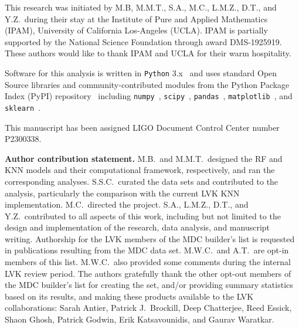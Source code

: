 This research was initiated by M.B, M.M.T., S.A., M.C., L.M.Z., D.T., and Y.Z.\ during their stay at the Institute of Pure and Applied Mathematics (IPAM),  University of California
Los-Angeles (UCLA). IPAM is partially supported by the National Science Foundation through award DMS-1925919. These authors would like to thank IPAM and UCLA for their warm hospitality.

Software for this analysis is written in \texttt{Python} 3.x~\cite{python3} and uses standard Open Source libraries and community-contributed modules from the Python Package Index (PyPI)
repository~\cite{pypi} including \texttt{numpy}~\cite{harris2020array}, \texttt{scipy}~\cite{2020SciPy-NMeth}, \texttt{pandas}~\cite{reback2020pandas,mckinney-proc-scipy-2010},
\texttt{matplotlib}~\cite{Hunter:2007ouj}, and \texttt{sklearn}~\cite{scikit-learn}.

This manuscript has been assigned LIGO Document Control Center number P2300338.

\textbf{Author contribution statement.} M.B.\ and M.M.T.\ designed the \ac{RF} and \ac{KNN} models and their computational framework, respectively, and ran the corresponding analyses.
S.S.C.\ curated the data sets and contributed to the analysis, particularly the comparison with the current \ac{LVK} \ac{KNN} implementation. M.C.\ directed the project. S.A., L.M.Z.,
D.T., and Y.Z.\ contributed to all aspects of this work, including but not limited to the design and implementation of the research, data analysis, and manuscript writing.  Authorship for
the \ac{LVK} members of the \ac{MDC} builder's list is requested in publications resulting from the \ac{MDC} data set.  M.W.C.\ and A.T.\ are opt-in members of this list. M.W.C.\ also
provided some comments during the internal \ac{LVK} review period. The authors gratefully thank the other opt-out members of the \ac{MDC} builder's list for creating the set, and/or
providing summary statistics based on its results, and making these products available to the \ac{LVK} collaborations: Sarah Antier, Patrick J.~Brockill, Deep Chatterjee, Reed Essick,
Shaon Ghosh, Patrick Godwin, Erik Katsavounidis, and Gaurav Waratkar.






